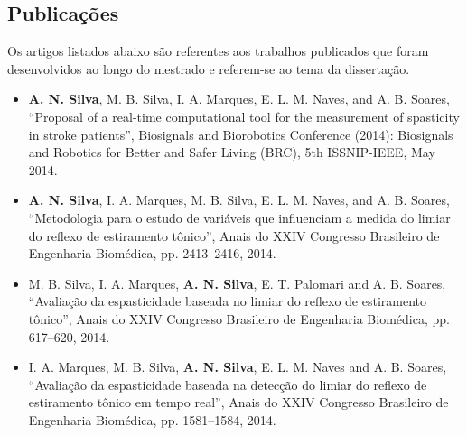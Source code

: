 

\newpage


\begin{center}

\section*{\Large{Publicações}}

\end{center}

Os artigos listados abaixo são referentes aos trabalhos publicados que foram desenvolvidos ao longo do mestrado e referem-se ao tema da dissertação.
\vspace{1cm}

\begin{itemize}

\item \textbf{A. N. Silva}, M. B. Silva, I. A. Marques, E. L. M. Naves, and A. B. Soares, “Proposal of a real-time computational tool for the measurement of spasticity in stroke patients”, Biosignals and Biorobotics Conference (2014): Biosignals and Robotics for Better and Safer Living (BRC), 5th ISSNIP-IEEE, May 2014.

\item \textbf{A. N. Silva}, I. A. Marques, M. B. Silva, E. L. M. Naves, and A. B. Soares, “Metodologia para o estudo de variáveis que influenciam a medida do limiar do reflexo de estiramento tônico”, Anais do XXIV Congresso Brasileiro de Engenharia Biomédica, pp. 2413–2416, 2014.

\item M. B. Silva, I. A. Marques, \textbf{A. N. Silva}, E. T. Palomari and A. B. Soares, “Avaliação da espasticidade baseada no limiar do reflexo de estiramento tônico”, Anais do XXIV Congresso Brasileiro de Engenharia Biomédica, pp. 617–620, 2014.

\item I. A. Marques, M. B. Silva, \textbf{A. N. Silva}, E. L. M. Naves and A. B. Soares, “Avaliação da espasticidade baseada na detecção do limiar do reflexo de estiramento tônico em tempo real”, Anais do XXIV Congresso Brasileiro de
Engenharia Biomédica, pp. 1581–1584, 2014.

\end{itemize}

